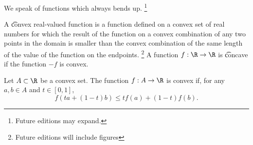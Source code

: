 
We speak of functions which always bends up.
  \ifhmode\unskip\fi\footnote{
Future editions may expand.
  }


A \t{convex} real-valued function is a function defined on a convex set of real numbers for which the result of the function on a convex combination of any two points in the domain is smaller than the convex combination of the same length of the value of the function on the endpoints.
  \ifhmode\unskip\fi\footnote{
Future editions will include figures
  }
A function $f: \R  \to \R $ is \t{concave} if the function $-f$ is convex.


Let $A \subset \R $ be a convex set.
The function $f: A \to \R $ is convex if, for any $a, b \in A$ and $t \in [0, 1]$,
  \[
f(ta + (1-t)b) \leq tf(a) + (1-t)f(b).
  \]

\blankpage
